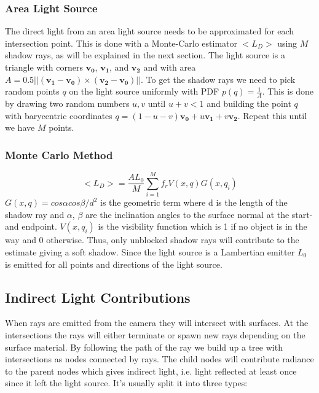 \documentclass[a4paper, twocolumn]{article}
\begin{document}
            \subsubsection{Area Light Source} \label{sec:area_light_source}
            The direct light from an area light source needs to be approximated for each intersection point. This is done with a Monte-Carlo estimator $<L_D>$ using $M$ shadow rays, as will be explained in the next section. The light source is a triangle with corners $\mathbf{v_0}$, $\mathbf{v_1}$, and $\mathbf{v_2}$ and with area $A = 0.5 ||(\mathbf{v_1} - \mathbf{v_0})\times(\mathbf{v_2}-\mathbf{v_0})||$. To get the shadow rays we need to pick random points $q$ on the light source uniformly with PDF $p(q) = \frac{1}{A}$. This is done by drawing two random numbers $u, v$ until $u + v < 1$ and building the point $q$ with barycentric coordinates $q = (1-u-v)\mathbf{v_0} + u\mathbf{v_1} + v\mathbf{v_2}$. Repeat this until we have $M$ points. 


            \subsubsection{Monte Carlo Method} \label{sec:monte_carlo_method}
            \begin{equation*}
              <L_D> = \frac{AL_0}{M}\sum_{i=1}^{M}{f_r V(x, q) G(x, q_i)}
            \end{equation*}
             $G(x, q) = cos\alpha cos\beta / d^2$ is the geometric term where d is the length of the shadow ray and $\alpha$, $\beta$ are the inclination angles to the surface normal at the start- and endpoint. $V(x, q_i)$ is the visibility function which is 1 if no object is in the way and 0 otherwise. Thus, only unblocked shadow rays will contribute to the estimate giving a soft shadow. Since the light source is a Lambertian emitter $L_0$ is emitted for all points and directions of the light source.
            
            \subsection{Indirect Light Contributions} \label{sec:indirect_light_contributions}
            When rays are emitted from the camera they will intersect with surfaces. At the intersections the rays will either terminate or spawn new rays depending on the surface material. By following the path of the ray we build up a tree with intersections as nodes connected by rays. The child nodes will contribute radiance to the parent nodes which gives indirect light, i.e. light reflected at least once since it left the light source. It's usually split it into three types:
\end{document}
